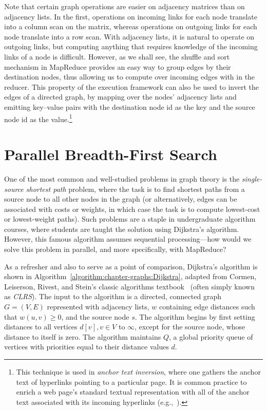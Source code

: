 Note that certain graph operations are easier on adjacency matrices
than on adjacency lists.  In the first, operations on incoming links
for each node translate into a column scan on the matrix, whereas
operations on outgoing links for each node translate into a row scan.
With adjacency lists, it is natural to operate on outgoing links, but
computing anything that requires knowledge of the incoming links of a
node is difficult.  However, as we shall see, the shuffle and sort
mechanism in MapReduce provides an easy way to group edges by their
destination nodes, thus allowing us to compute over incoming edges
with in the reducer.  This property of the execution framework can
also be used to invert the edges of a directed graph, by mapping over
the nodes' adjacency lists and emitting key--value pairs with the
destination node id as the key and the source node id as the
value.\footnote{This technique is used in \emph{anchor text inversion},
  where one gathers the anchor text of hyperlinks pointing to a
  particular page.  It is common practice to enrich a web page's
  standard textual representation with all of the anchor text
  associated with its incoming hyperlinks
  (e.g.,~\cite{Metzler_etal_2009}).}

\section{Parallel Breadth-First Search}
\label{chapter-graphs:BFS}

One of the most common and well-studied problems in graph theory is
the \emph{single-source shortest path} problem, where the task is to
find shortest paths from a source node to all other nodes in the graph
(or alternatively, edges can be associated with costs or weights, in
which case the task is to compute lowest-cost or lowest-weight paths).
Such problems are a staple in undergraduate algorithm courses, where
students are taught the solution using Dijkstra's algorithm.  However,
this famous algorithm assumes sequential processing---how would we
solve this problem in parallel, and more specifically, with MapReduce?

As a refresher and also to serve as a point of comparison, Dijkstra's
algorithm is shown in Algorithm~\ref{algorithm:chapter-graphs:Dijkstra},
adapted from Cormen, Leiserson, Rivest, and Stein's classic algorithms
textbook~\cite{CLRS} (often simply known as \emph{CLRS}).  The input to
the algorithm is a directed, connected graph $G=(V,E)$ represented
with adjacency lists, $w$ containing edge distances such that $w(u,v)
\geq 0$, and the source node $s$.  The algorithm begins by first
setting distances to all vertices $d[v], v \in V$ to $\infty$, except
for the source node, whose distance to itself is zero.  The algorithm
maintains $Q$, a global priority queue of vertices with priorities equal to
their distance values $d$.


